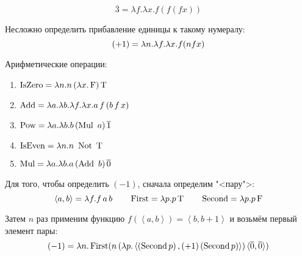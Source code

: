 \begin{example}
	\[
	\overline{3} = \lambda f . \lambda x . f \left(f \left(f x\right)\right)
	\]
\end{example}

Несложно определить прибавление единицы к такому нумералу:
\[
	(+1) = \lambda{}n.\lambda{}f.\lambda{}x.f(nfx) \\
\]



Арифметические операции:
\begin{enumerate}
	\item $\operatorname{IsZero} = \lambda{}n.n\mathinner{(\lambda{}x.\operatorname{F})} \operatorname{T}$ 
	\item $\operatorname{Add} =\lambda{}a.\lambda{}b.\lambda{}f.\lambda{}x.a \mathinner{f} (b \mathinner{f} x)$ 
	\item $\operatorname{Pow} = \lambda{}a.\lambda{}b.b \mathinner{(\operatorname{Mul}  \  a)} \mathinner{\overline{1}}$
	\item $\func{IsEven} = \lambda{}n.n \ \func{Not} \ \Tl$
	\item $\operatorname{Mul} = \lambda{}a.\lambda{}b.a \mathinner{(\operatorname{Add}\ b)} \mathinner{\overline{0}}$
\end{enumerate}

Для того, чтобы определить $(-1)$, сначала определим "<пару">:
\[
\left<a,b\right> = \lambda f.f \mathinner{a} b \qquad
\operatorname{First} = \lambda p . p \operatorname{T} \qquad
\operatorname{Second} = \lambda p . p \operatorname{F}
\]%

Затем $n$ раз применим функцию $f\left(\left<a,b\right>\right) = \left<b,b+1\right>$ и возьмём первый элемент пары:
\[
(-1) = \lambda n . \operatorname{First}
(n \mathinner{(\lambda p . \left<\left(\operatorname{Second} p\right), \mathinner{(+1)} (\operatorname{Second} p)\right>)}
\langle\overline{0},\overline{0}\rangle)
\]
